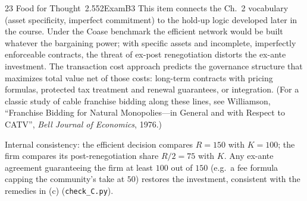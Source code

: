 \begin{exsol}{23}{\MR{} Food for Thought~2.5}{52}{Exam}{B3}
\interp This item connects the Ch.~2 vocabulary (asset specificity, imperfect commitment) to the
hold-up logic developed later in the course. Under the Coase benchmark the efficient network would
be built whatever the bargaining power; with specific assets and incomplete, imperfectly enforceable
contracts, the threat of ex-post renegotiation distorts the ex-ante investment. The transaction
cost approach predicts the governance structure that maximizes total value net of those costs:
long-term contracts with pricing formulas, protected tax treatment and renewal guarantees, or
integration. (For a classic study of cable franchise bidding along these lines, see Williamson,
``Franchise Bidding for Natural Monopolies---in General and with Respect to CATV'', \emph{Bell
Journal of Economics}, 1976.)

\verify Internal consistency: the efficient decision compares $R = 150$ with $K = 100$; the firm
compares its post-renegotiation share $R/2 = 75$ with $K$. Any ex-ante agreement guaranteeing the
firm at least $100$ out of $150$ (e.g.\ a fee formula capping the community's take at $50$)
restores the investment, consistent with the remedies in (c) (\texttt{check\_C.py}).

\end{exsol}

